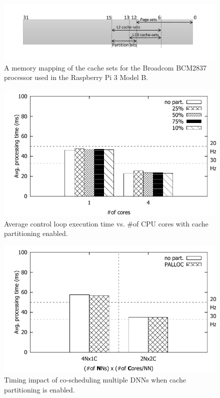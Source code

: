 \begin{figure}[h]
  \centering
  \includegraphics[width=\textwidth]{figs/cache-mapping}
  \caption{A memory mapping of the cache sets for the Broadcom 
BCM2837 processor used in the Raspberry Pi 3 Model B.}
  \label{fig:cache-mapping}
\end{figure}

\begin{figure}[h]
  \centering
  \includegraphics[width=.7\textwidth]{figs/palloc_multicore}
  \caption{Average control loop execution time vs. \#of CPU
    cores with cache partitioning enabled.}
  \label{fig:palloc_multicore}
\end{figure}

\begin{figure}[h]
  \centering
  \includegraphics[width=.7\textwidth]{figs/palloc_multimodel}
  \caption{Timing impact of co-scheduling multiple DNNs when cache 
partitioning is enabled.}
  \label{fig:palloc_multimodel}
\end{figure}

